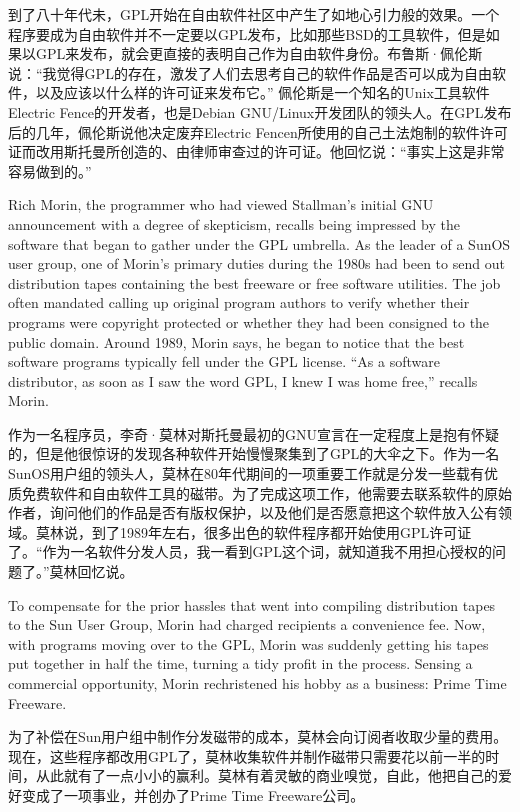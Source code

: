 \ifdefined\chs
到了八十年代未，GPL开始在自由软件社区中产生了如地心引力般的效果。一个程序要成为自由软件并不一定要以GPL发布，比如那些BSD的工具软件，但是如果以GPL来发布，就会更直接的表明自己作为自由软件身份。布鲁斯·佩伦斯说：``我觉得GPL的存在，激发了人们去思考自己的软件作品是否可以成为自由软件，以及应该以什么样的许可证来发布它。'' 佩伦斯是一个知名的Unix工具软件Electric Fence的开发者，也是Debian GNU/Linux开发团队的领头人。在GPL发布后的几年，佩伦斯说他决定废弃Electric Fencen所使用的自己土法炮制的软件许可证而改用斯托曼所创造的、由律师审查过的许可证。他回忆说：``事实上这是非常容易做到的。''
\fi

\ifdefined\eng
Rich Morin, the programmer who had viewed Stallman's initial GNU announcement with a degree of skepticism, recalls being impressed by the software that began to gather under the GPL umbrella. As the leader of a SunOS user group, one of Morin's primary duties during the 1980s had been to send out distribution tapes containing the best freeware or free software utilities. The job often mandated calling up original program authors to verify whether their programs were copyright protected or whether they had been consigned to the public domain. Around 1989, Morin says, he began to notice that the best software programs typically fell under the GPL license. ``As a software distributor, as soon as I saw the word GPL, I knew I was home free,'' recalls Morin.
\fi

\ifdefined\chs
作为一名程序员，李奇·莫林对斯托曼最初的GNU宣言在一定程度上是抱有怀疑的，但是他很惊讶的发现各种软件开始慢慢聚集到了GPL的大伞之下。作为一名SunOS用户组的领头人，莫林在80年代期间的一项重要工作就是分发一些载有优质免费软件和自由软件工具的磁带。为了完成这项工作，他需要去联系软件的原始作者，询问他们的作品是否有版权保护，以及他们是否愿意把这个软件放入公有领域。莫林说，到了1989年左右，很多出色的软件程序都开始使用GPL许可证了。``作为一名软件分发人员，我一看到GPL这个词，就知道我不用担心授权的问题了。''莫林回忆说。
\fi

\ifdefined\eng
To compensate for the prior hassles that went into compiling distribution tapes to the Sun User Group, Morin had charged recipients a convenience fee. Now, with programs moving over to the GPL, Morin was suddenly getting his tapes put together in half the time, turning a tidy profit in the process. Sensing a commercial opportunity, Morin rechristened his hobby as a business: Prime Time Freeware.
\fi

\ifdefined\chs
为了补偿在Sun用户组中制作分发磁带的成本，莫林会向订阅者收取少量的费用。现在，这些程序都改用GPL了，莫林收集软件并制作磁带只需要花以前一半的时间，从此就有了一点小小的赢利。莫林有着灵敏的商业嗅觉，自此，他把自己的爱好变成了一项事业，并创办了Prime Time Freeware公司。
\fi

